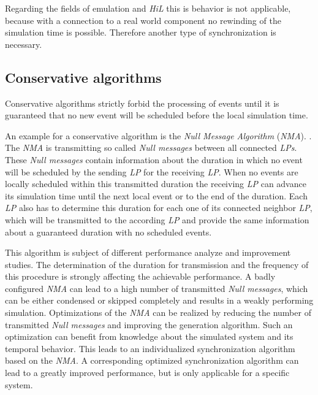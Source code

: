 Regarding the fields of emulation and \emph{HiL} this is behavior is not applicable, because with a connection to a real world component no rewinding of the simulation time is possible.
Therefore another type of synchronization is necessary.
    
\subsection{Conservative algorithms}
\label{sec:parallel_synchronization_conservative}
Conservative algorithms strictly forbid the processing of events until it is guaranteed that no new event will be scheduled before the local simulation time.

An example for a conservative algorithm is the \emph{Null Message Algorithm} (\emph{NMA}). \cite[section 2.1]{bagrodia_performance_2000}.
The \emph{NMA} is transmitting so called \emph{Null messages} between all connected \emph{LPs}.
These \emph{Null messages} contain information about the duration in which no event will be scheduled by the sending \emph{LP} for the receiving \emph{LP}.
When no events are locally scheduled within this transmitted duration the receiving \emph{LP} can advance its simulation time until the next local event or to the end of the duration.
Each \emph{LP} also has to determine this duration for each one of its connected neighbor \emph{LP}, which will be transmitted to the according \emph{LP} and provide the same information about a guaranteed duration with no scheduled events.\cite[section 3]{kumar_study_1993}

This algorithm is subject of different performance analyze and improvement studies. \cite{kumar_study_1993} \cite{rizvi_reducing_2008} \cite{Varga03apractical}
The determination of the duration for transmission and the frequency of this procedure is strongly affecting the achievable performance.
A badly configured \emph{NMA} can lead to a high number of transmitted \emph{Null messages}, which can be either condensed or skipped completely and results in a weakly performing simulation.
Optimizations of the \emph{NMA} can be realized by reducing the number of transmitted \emph{Null messages} and improving the generation algorithm. \cite{de_vries_reducing_1990}
Such an optimization can benefit from knowledge about the simulated system and its temporal behavior.
This leads to an individualized synchronization algorithm based on the \emph{NMA}.
A corresponding optimized synchronization algorithm can lead to a greatly improved performance, but is only applicable for a specific system.
\\

